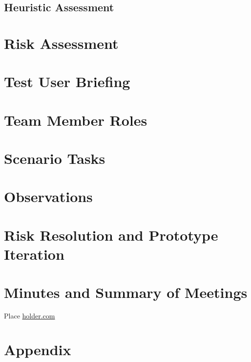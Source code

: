 \documentclass{article}
\begin{document}
        \subsection{Heuristic Assessment}
    \newpage

    \section{Risk Assessment}
    \newpage

    \section{Test User Briefing}
    \newpage

    \section{Team Member Roles}
    \newpage

    \section{Scenario Tasks}
    \newpage

    \section{Observations}
    \newpage

    \section{Risk Resolution and Prototype Iteration}
    \newpage

    \section{Minutes and Summary of Meetings}
    \newpage

    \begin{thebibliography}{9}
        \raggedright
            Place \url{holder.com}
    \end{thebibliography}

    \newpage
    \section{Appendix}
    \label{sec:Appendix}
    
    
\end{document}
